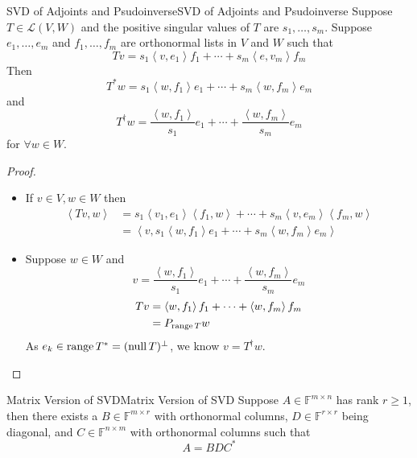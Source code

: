 \documentclass[../main.tex]{subfiles}
\begin{document}
\begin{theorem}{SVD of Adjoints and Psudoinverse}{SVD of Adjoints and Psudoinverse}
Suppose $T\in \mathscr{L}(V,W)$ and the positive singular values of $T$ are $s_1, \ldots ,s_m$. Suppose $e_1, \ldots ,e_m$ and $f_1, \ldots ,f_m$ are orthonormal lists in $V$ and $W$ such that
\begin{equation*}
Tv = s_1 \left<v,e_1\right>f_1+ \cdots + s_m \left<e,v_m\right>f_m
\end{equation*}
Then
\begin{equation*}
T^*w = s_1 \left<w,f_1\right>e_1 + \cdots + s_m \left<w,f_m\right>e_m
\end{equation*}
and 
\begin{equation*}
T^{\dagger} w = \frac{\left<w,f_1\right>}{s_1}e_1 +\cdots +\frac{\left<w,f_m\right>}{s_m}e_m
\end{equation*}
for $\forall w\in W$.
\end{theorem}

\begin{proof}
\begin{itemize}
\item If $v\in V,w\in W$ then
\begin{equation*}
\begin{aligned}
	\left<Tv,w\right> &= s_1 \left<v_1,e_1\right> \left<f_1,w\right> + \cdots + s_m \left<v,e_m\right> \left<f_m,w\right>\\
			  &= \left<v, s_1 \left<w,f_1\right>e_1 +\cdots + s_m \left<w,f_m\right>e_m \right>
\end{aligned}
\end{equation*}

\item Suppose $w\in W$ and 
	\begin{equation*}
	v = \frac{\left<w,f_1\right>}{s_1}e_1 +\cdots +\frac{\left<w,f_m\right>}{s_m}e_m
	\end{equation*}
\begin{equation*}
\begin{aligned}
	Tv &= \left<w,f_1\right>f_1 +\cdots + \left<w,f_m\right>f_m\\
	   &= P_{\operatorname{range} T}w
\end{aligned}
\end{equation*}
As $e_k\in \operatorname{range} T^* = (\operatorname{null} T)^{\perp}$, we know $v = T^{\dagger}w$.
\end{itemize}
\end{proof}

\begin{theorem}{Matrix Version of SVD}{Matrix Version of SVD}
Suppose $A\in \mathbb{F}^{m \times n}$ has rank $r \geq 1$, then there exists a $B\in \mathbb{F}^{m \times r}$ with orthonormal columns, $D\in \mathbb{F}^{r \times r}$ being diagonal, and $C\in \mathbb{F}^{n \times m}$ with orthonormal columns such that
\begin{equation}
A = BDC^*
\end{equation}
\end{theorem}
\end{document}
